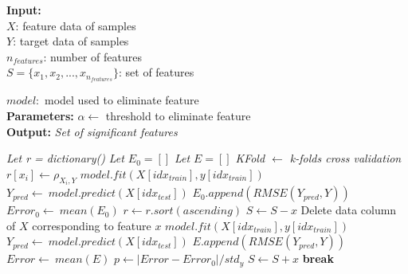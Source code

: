 \documentclass[10pt, a4paper, oneside]{article}
\begin{document}
\begin{algorithm}[!ht]
    \footnotesize
	\caption{Backward Elimination}
    \label{alg: Algorithm 3}
        \textbf{Input:} \\
        \hspace*{\algorithmicindent} {$X$: feature data of samples} \\
        \hspace*{\algorithmicindent} {$Y$: target data of samples} \\
        \hspace*{\algorithmicindent} {$n_{features}$: number of features} \\
        \hspace*{\algorithmicindent} $S = \{x_{1}, x_{2}, ... , x_{n_{features}}\}$: set of features
        
        \hspace*{\algorithmicindent} {$model:$ model used to eliminate feature} \\
        \textbf{Parameters:} $\alpha \leftarrow$ threshold to eliminate feature \\
        \textbf{Output:} \textit{Set of significant features}
	\begin{algorithmic}[1]
            \State \textit{Let r = dictionary()}
            \State \textit{Let $E_0 = []$}
            \State \textit{Let $E = []$}
            \State \textit{KFold $\leftarrow$ k-folds cross validation} 
             \State $r[x_{i}] \leftarrow \rho_{X_{i}, Y}$ 
		\EndFor
			\State $model.fit(X[idx_{train}], y[idx_{train}])$
            \State $Y_{pred} \leftarrow\ model.predict(X[idx_{test}])$
            \State $E_0.append(RMSE(Y_{pred}, Y))$
        \EndFor
        \State $Error_0 \leftarrow\ mean(E_0)$ 
        \State \(r \leftarrow r.sort(ascending)\)
                \State $S \leftarrow S-x$
                \State Delete data column of $X$ corresponding to feature $x$
			         \State $model.fit(X[idx_{train}], y[idx_{train}])$
                      \State $Y_{pred} \leftarrow\ model.predict(X[idx_{test}])$
                      \State $E.append(RMSE(Y_{pred}, Y))$
                \EndFor
                \State $Error \leftarrow\ mean(E)$ 
                \State $p \leftarrow |Error - Error_{0}|/std_{y}$ 
                    \State $S \leftarrow S+x$
                    \State \textbf{break}
                \EndIf
            \EndFor
	\end{algorithmic} 
\end{algorithm}
\end{document}
